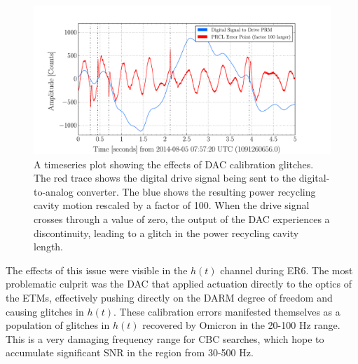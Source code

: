 \begin{figure}[ht!]%
\includegraphics[width=\textwidth]{figures/detchar/PRCL-DAC-glitch}
\caption[DAC glitches in PRCL]{A timeseries plot showing the effects of %
         DAC calibration glitches. The red trace shows the digital drive %
         signal being sent to the digital-to-analog converter. The blue %
         shows the resulting power recycling cavity motion rescaled by a %
         factor of 100. When the drive signal crosses %
         through a value of zero, the output of the DAC experiences a %
         discontinuity, leading to a glitch in the power recycling cavity %
         length.}
\end{figure}\label{fig:DAC-glitch}

The effects of this issue were visible in the $h(t)$ channel during ER6. 
The most problematic culprit was the DAC that applied actuation directly 
to the optics of the ETMs, effectively pushing directly on the DARM degree 
of freedom and causing glitches in $h(t)$. These calibration errors manifested 
themselves as a population of glitches in $h(t)$ recovered by Omicron in the 
20-100 Hz range. This is a very damaging frequency range for CBC searches, 
which hope to accumulate significant SNR in the region from 30-500 Hz.  

